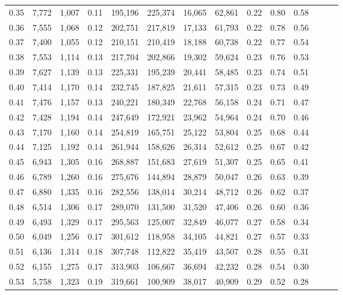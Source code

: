 \begin{tabular}{rrrrrrrrrrrrrr}
0.35 &  7,772 &  1,007 &  0.11 &  195,196 &  225,374 &  16,065 &  62,861 &  0.22 &  0.80 &      0.58 \\
0.36 &  7,555 &  1,068 &  0.12 &  202,751 &  217,819 &  17,133 &  61,793 &  0.22 &  0.78 &      0.56 \\
0.37 &  7,400 &  1,055 &  0.12 &  210,151 &  210,419 &  18,188 &  60,738 &  0.22 &  0.77 &      0.54 \\
0.38 &  7,553 &  1,114 &  0.13 &  217,704 &  202,866 &  19,302 &  59,624 &  0.23 &  0.76 &      0.53 \\
0.39 &  7,627 &  1,139 &  0.13 &  225,331 &  195,239 &  20,441 &  58,485 &  0.23 &  0.74 &      0.51 \\
0.40 &  7,414 &  1,170 &  0.14 &  232,745 &  187,825 &  21,611 &  57,315 &  0.23 &  0.73 &      0.49 \\
0.41 &  7,476 &  1,157 &  0.13 &  240,221 &  180,349 &  22,768 &  56,158 &  0.24 &  0.71 &      0.47 \\
0.42 &  7,428 &  1,194 &  0.14 &  247,649 &  172,921 &  23,962 &  54,964 &  0.24 &  0.70 &      0.46 \\
0.43 &  7,170 &  1,160 &  0.14 &  254,819 &  165,751 &  25,122 &  53,804 &  0.25 &  0.68 &      0.44 \\
0.44 &  7,125 &  1,192 &  0.14 &  261,944 &  158,626 &  26,314 &  52,612 &  0.25 &  0.67 &      0.42 \\
0.45 &  6,943 &  1,305 &  0.16 &  268,887 &  151,683 &  27,619 &  51,307 &  0.25 &  0.65 &      0.41 \\
0.46 &  6,789 &  1,260 &  0.16 &  275,676 &  144,894 &  28,879 &  50,047 &  0.26 &  0.63 &      0.39 \\
0.47 &  6,880 &  1,335 &  0.16 &  282,556 &  138,014 &  30,214 &  48,712 &  0.26 &  0.62 &      0.37 \\
0.48 &  6,514 &  1,306 &  0.17 &  289,070 &  131,500 &  31,520 &  47,406 &  0.26 &  0.60 &      0.36 \\
0.49 &  6,493 &  1,329 &  0.17 &  295,563 &  125,007 &  32,849 &  46,077 &  0.27 &  0.58 &      0.34 \\
0.50 &  6,049 &  1,256 &  0.17 &  301,612 &  118,958 &  34,105 &  44,821 &  0.27 &  0.57 &      0.33 \\
0.51 &  6,136 &  1,314 &  0.18 &  307,748 &  112,822 &  35,419 &  43,507 &  0.28 &  0.55 &      0.31 \\
0.52 &  6,155 &  1,275 &  0.17 &  313,903 &  106,667 &  36,694 &  42,232 &  0.28 &  0.54 &      0.30 \\
0.53 &  5,758 &  1,323 &  0.19 &  319,661 &  100,909 &  38,017 &  40,909 &  0.29 &  0.52 &      0.28 \\

\end{tabular}
